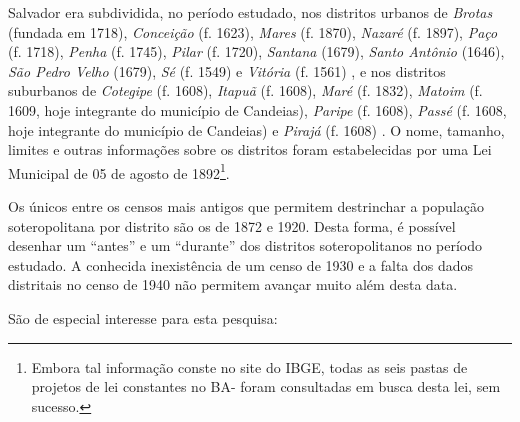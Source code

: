 Salvador era subdividida, no período estudado, nos distritos urbanos de \textit{Brotas} (fundada em 1718), \textit{Conceição} (f. 1623), \textit{Mares} (f. 1870), \textit{Nazaré} (f. 1897), \textit{Paço} (f. 1718), \textit{Penha} (f. 1745), \textit{Pilar} (f. 1720), \textit{Santana} (1679), \textit{Santo Antônio }(1646), \textit{São Pedro Velho} (1679), \textit{Sé} (f. 1549) e \textit{Vitória} (f. 1561) \cite[259-307]{VASCONCELOS2002}, e nos distritos suburbanos de \textit{Cotegipe} (f. 1608), \textit{Itapuã} (f. 1608), \textit{Maré} (f. 1832), \textit{Matoim} (f. 1609, hoje integrante do município de Candeias), \textit{Paripe} (f. 1608), \textit{Passé} (f. 1608, hoje integrante do município de Candeias) e \textit{Pirajá} (f. 1608) \cite[p.~53-62]{NASCIMENTO2007}. O nome, tamanho, limites e outras informações sobre os distritos foram estabelecidas por uma Lei Municipal de 05 de agosto de 1892\footnote{Embora tal informação conste no site do IBGE, todas as seis pastas de projetos de lei constantes no BA- foram consultadas em busca desta lei, sem sucesso.}.

Os únicos entre os censos mais antigos que permitem destrinchar a população soteropolitana por distrito são os de 1872 e 1920. Desta forma, é possível desenhar um ``antes'' e um ``durante'' dos distritos soteropolitanos no período estudado. A conhecida inexistência de um censo de 1930 e a falta dos dados distritais no censo de 1940 não permitem avançar muito além desta data. 

São de especial interesse para esta pesquisa:

